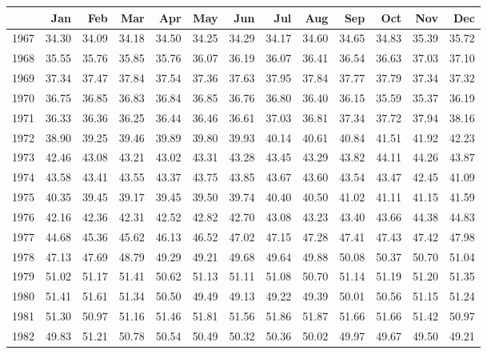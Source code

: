 \begin{longtable}{rrrrrrrrrrrrr}
  \hline
 & Jan & Feb & Mar & Apr & May & Jun & Jul & Aug & Sep & Oct & Nov & Dec \\ 
  \hline
1967 & 34.30 & 34.09 & 34.18 & 34.50 & 34.25 & 34.29 & 34.17 & 34.60 & 34.65 & 34.83 & 35.39 & 35.72 \\ 
  1968 & 35.55 & 35.76 & 35.85 & 35.76 & 36.07 & 36.19 & 36.07 & 36.41 & 36.54 & 36.63 & 37.03 & 37.10 \\ 
  1969 & 37.34 & 37.47 & 37.84 & 37.54 & 37.36 & 37.63 & 37.95 & 37.84 & 37.77 & 37.79 & 37.34 & 37.32 \\ 
  1970 & 36.75 & 36.85 & 36.83 & 36.84 & 36.85 & 36.76 & 36.80 & 36.40 & 36.15 & 35.59 & 35.37 & 36.19 \\ 
  1971 & 36.33 & 36.36 & 36.25 & 36.44 & 36.46 & 36.61 & 37.03 & 36.81 & 37.34 & 37.72 & 37.94 & 38.16 \\ 
  1972 & 38.90 & 39.25 & 39.46 & 39.89 & 39.80 & 39.93 & 40.14 & 40.61 & 40.84 & 41.51 & 41.92 & 42.23 \\ 
  1973 & 42.46 & 43.08 & 43.21 & 43.02 & 43.31 & 43.28 & 43.45 & 43.29 & 43.82 & 44.11 & 44.26 & 43.87 \\ 
  1974 & 43.58 & 43.41 & 43.55 & 43.37 & 43.75 & 43.85 & 43.67 & 43.60 & 43.54 & 43.47 & 42.45 & 41.09 \\ 
  1975 & 40.35 & 39.45 & 39.17 & 39.45 & 39.50 & 39.74 & 40.40 & 40.50 & 41.02 & 41.11 & 41.15 & 41.59 \\ 
  1976 & 42.16 & 42.36 & 42.31 & 42.52 & 42.82 & 42.70 & 43.08 & 43.23 & 43.40 & 43.66 & 44.38 & 44.83 \\ 
  1977 & 44.68 & 45.36 & 45.62 & 46.13 & 46.52 & 47.02 & 47.15 & 47.28 & 47.41 & 47.43 & 47.42 & 47.98 \\ 
  1978 & 47.13 & 47.69 & 48.79 & 49.29 & 49.21 & 49.68 & 49.64 & 49.88 & 50.08 & 50.37 & 50.70 & 51.04 \\ 
  1979 & 51.02 & 51.17 & 51.41 & 50.62 & 51.13 & 51.11 & 51.08 & 50.70 & 51.14 & 51.19 & 51.20 & 51.35 \\ 
  1980 & 51.41 & 51.61 & 51.34 & 50.50 & 49.49 & 49.13 & 49.22 & 49.39 & 50.01 & 50.56 & 51.15 & 51.24 \\ 
  1981 & 51.30 & 50.97 & 51.16 & 51.46 & 51.81 & 51.56 & 51.86 & 51.87 & 51.66 & 51.66 & 51.42 & 50.97 \\ 
  1982 & 49.83 & 51.21 & 50.78 & 50.54 & 50.49 & 50.32 & 50.36 & 50.02 & 49.97 & 49.67 & 49.50 & 49.21 \\ 

\end{longtable}
